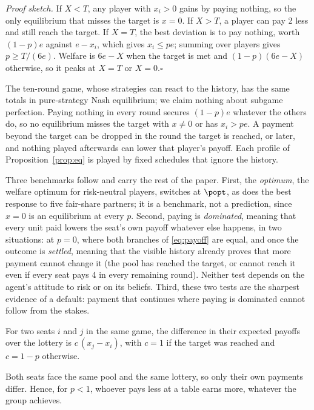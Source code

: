 \noindent\emph{Proof sketch.} If $X<T$, any player with $x_i>0$ gains by paying nothing, so
the only equilibrium that misses the target is $x=0$. If $X>T$, a player can pay 2 less and
still reach the target. If $X=T$, the best deviation is to pay nothing, worth $(1-p)e$
against $e-x_i$, which gives $x_i\le pe$; summing over players gives $p\ge T/(6e)$. Welfare
is $6e-X$ when the target is met and $(1-p)(6e-X)$ otherwise, so it peaks at $X=T$ or
$X=0$.\hfill$\square$

The ten-round game, whose strategies can react to the history, has the same totals in
pure-strategy Nash equilibrium; we claim nothing about subgame perfection. Paying nothing
in every round secures $(1-p)e$ whatever the others do, so no equilibrium misses the target
with $x\neq0$ or has $x_i>pe$. A payment
beyond the target can be dropped in the round the target is reached, or later, and nothing
played afterwards can lower that player's payoff. Each profile of
Proposition~\ref{prop:eq} is played by fixed schedules that ignore the history.

Three benchmarks follow and carry the rest of the paper. First, the \emph{optimum}, the
welfare optimum for risk-neutral players, switches at $\popt$, as does the best response to
five fair-share partners; it is a benchmark, not a prediction, since $x=0$ is an equilibrium
at every $p$. Second, paying is
\emph{dominated}, meaning that every unit paid lowers the seat's own payoff whatever else
happens, in two situations: at $p=0$, where both branches of \eqref{eq:payoff} are equal,
and once the outcome is \emph{settled}, meaning that the visible history already proves that
more payment cannot change it (the pool has reached the target, or cannot reach it even if
every seat pays 4 in every remaining round). Neither test depends on the agent's attitude to
risk or on its beliefs. Third, these two tests are the sharpest evidence of a default:
payment that continues where paying is dominated cannot follow from the stakes.

\begin{proposition}
\label{prop:table}
For two seats $i$ and $j$ in the same game, the difference in their expected payoffs over
the lottery is $c\,(x_j-x_i)$, with $c=1$ if the target was reached and $c=1-p$ otherwise.
\end{proposition}

\noindent Both seats face the same pool and the same lottery, so only their own payments
differ. Hence, for $p<1$, whoever pays less at a table earns more, whatever the group
achieves.

